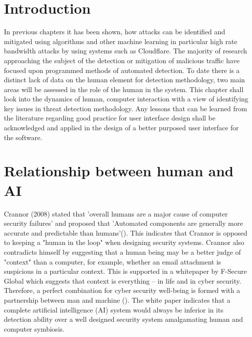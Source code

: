 \section{Introduction}
In previous chapters it has been shown, how attacks can be identified and mitigated using algorithms and other machine learning in particular high rate bandwidth attacks by using systems such as Cloudflare. The majority of research approaching the subject of the detection or mitigation of malicious traffic have focused upon programmed methods of automated detection. To date there is a distinct lack of data on the human element for detection methodology, two main areas will be assessed in the role of the human in the system. This chapter shall look into the dynamics of human, computer interaction with a view of identifying key issues in threat detection methodology. Any lessons that can be learned from the literature regarding good practice for user interface design shall be acknowledged and applied in the design of a better purposed user interface for the software. 

\section{Relationship between human and AI}

Crannor (2008) stated that 'overall humans are a major cause of computer security failures' and proposed that 'Automated components are generally more accurate and predictable than humans'(\cite{cranor2008framework}). This indicates that Crannor is opposed to keeping a "human in the loop" when designing security systems. Crannor also contradicts himself by suggesting that a human being may be a better judge of "context" than a computer, for example, whether an email attachment is suspicious in a particular context. This is supported in a whitepaper by F-Secure Global which suggests that context is everything – in life and in cyber security. Therefore, a perfect combination for cyber security well-being is formed with a partnership between man and machine (\cite{TargetedCyberSecurity}). The white paper indicates that a complete artificial intelligence (AI) system would always be inferior in its detection ability over a well designed security system amalgamating human and computer symbiosis. 

